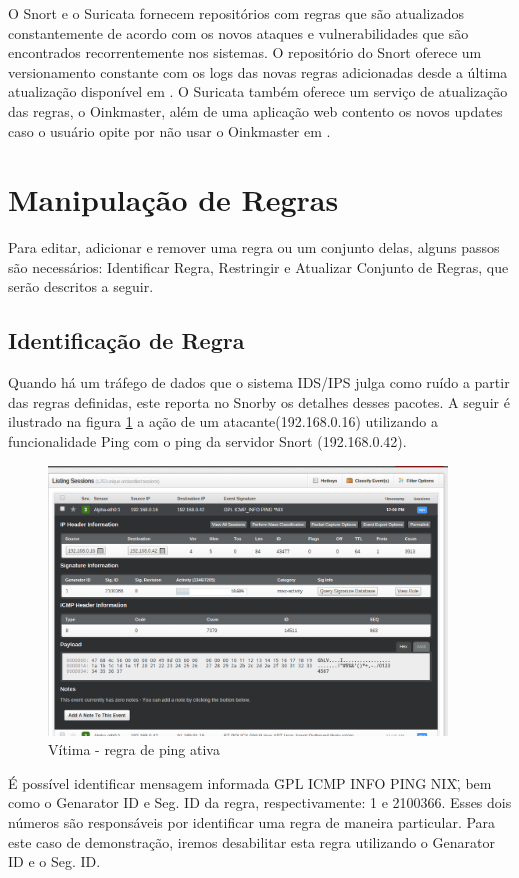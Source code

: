 O Snort e o Suricata fornecem repositórios com regras que são atualizados constantemente
de acordo com os novos ataques e vulnerabilidades que são encontrados recorrentemente nos
 sistemas. O repositório do Snort oferece um versionamento constante com os logs
 das novas regras adicionadas desde a última atualização disponível em \cite{snortRules}. O
 Suricata também oferece um serviço de atualização das regras, o Oinkmaster,
 além de uma aplicação web contento os novos updates caso o usuário opite por
 não usar o Oinkmaster em \cite{suricataRules}.

 \section{Manipulação de Regras}
 Para editar, adicionar e remover uma regra ou um conjunto delas, alguns passos
 são necessários: Identificar Regra, Restringir e Atualizar Conjunto de Regras,
 que serão descritos a seguir.

 \subsection{Identificação de Regra}
 Quando há um tráfego de dados que o sistema IDS/IPS julga como ruído a partir das
 regras definidas, este reporta no Snorby os detalhes desses pacotes. A seguir
 é ilustrado na figura \ref{fig:regra_ping_ativa} a ação de um atacante(192.168.0.16)
 utilizando a funcionalidade Ping com o ping da servidor Snort (192.168.0.42).

 \begin{figure}[h]
  \centering
  \includegraphics[width=400px, scale=1]{resource/regra_ping_ativa}
  \caption{Vítima - regra de ping ativa}
\label{fig:regra_ping_ativa}
\end{figure}

É possível identificar mensagem informada \"GPL ICMP INFO PING NIX\", bem como
o Genarator ID e Seg. ID da regra, respectivamente: 1 e 2100366. Esses dois
números são responsáveis por identificar uma regra de maneira particular.
Para este caso de demonstração, iremos desabilitar esta regra utilizando o Genarator
ID e o Seg. ID.


